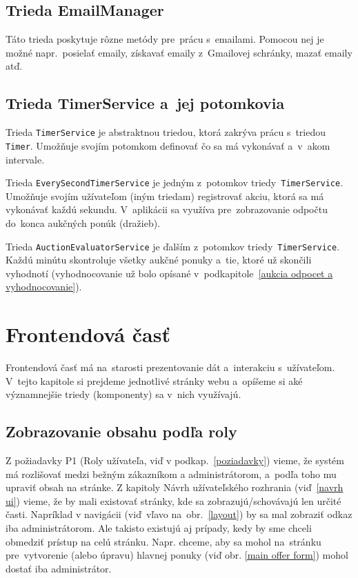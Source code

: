 \subsection{Trieda EmailManager}
\label{trieda emailmanager}

Táto trieda poskytuje rôzne metódy pre~prácu s~emailami. Pomocou nej je možné napr.~posielať emaily, získavať emaily z~Gmailovej schránky, mazať emaily atď.

\subsection{Trieda TimerService a~jej potomkovia}
\label{trieda timerservice}

Trieda \verb|TimerService| je abstraktnou triedou, ktorá zakrýva prácu s~triedou \verb|Timer|. Umožňuje svojím potomkom definovať čo sa má vykonávať a~v~akom intervale.

Trieda \verb|EverySecondTimerService| je jedným z~potomkov triedy~\verb|TimerService|. Umožňuje svojím užívateľom (iným triedam) registrovať akciu, ktorá sa má vykonávať každú sekundu. V~aplikácii sa využíva pre~zobrazovanie odpočtu do~konca aukčných ponúk (dražieb).

Trieda \verb|AuctionEvaluatorService| je ďalším z~potomkov triedy~\verb|TimerService|. Každú minútu skontroluje všetky aukčné ponuky a~tie, ktoré už skončili vyhodnotí (vyhodnocovanie už bolo opísané v~podkapitole~\ref{aukcia odpocet a vyhodnocovanie}).

\section{Frontendová časť}

Frontendová časť má na~starosti prezentovanie dát a~interakciu s~užívateľom. V~tejto kapitole si prejdeme jednotlivé stránky webu a~opíšeme si aké významnejšie triedy (komponenty) sa v~nich využívajú.

\subsection{Zobrazovanie obsahu podľa roly}
\label{zobrazovanie obsahu podla roly}

Z požiadavky P1 (Roly užívateľa, viď v podkap.~\ref{poziadavky}) vieme, že systém má rozlišovať medzi bežným zákazníkom a administrátorom, a~podľa toho mu upraviť obsah na stránke. Z kapitoly Návrh užívateľského rozhrania (viď~\ref{navrh ui}) vieme, že by mali existovať stránky, kde sa zobrazujú/schovávajú len určité časti. Napríklad v navigácii (viď~vľavo na~obr.~\ref{layout}) by sa mal zobraziť odkaz  iba administrátorom. Ale takisto existujú aj prípady, kedy by sme chceli obmedziť prístup na celú stránku. Napr. chceme, aby sa mohol na~stránku pre~vytvorenie (alebo úpravu) hlavnej ponuky (viď obr. \ref{main offer form}) mohol dostať iba administrátor.

